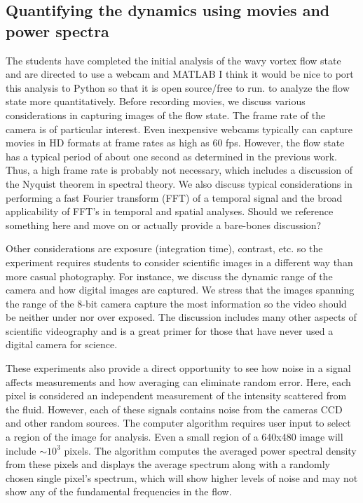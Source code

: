 \documentclass[%
reprint,
 amsmath,amssymb,
 aps,
prb,
floatfix,
longbibliography,
notitlepage
]{revtex4-1}
\newcommand{\DB}[1]{{\color{red}#1}} %
\begin{document}
\subsection{Quantifying the dynamics using movies and power spectra}%
The students have completed the initial analysis of the wavy vortex flow state and are directed to use a webcam and MATLAB \DB{I think it would be nice to port this analysis to Python so that it is open source/free to run.} to analyze the flow state more quantitatively. Before recording movies, we discuss various considerations in capturing images of the flow state. The frame rate of the camera is of particular interest. Even inexpensive webcams typically can capture movies in HD formats at frame rates as high as 60 fps. However, the flow state has a typical period of about one second as determined in the previous work. Thus, a high frame rate is probably not necessary, which includes a discussion of the Nyquist theorem in spectral theory.\cite{nyquist} We also discuss typical considerations in performing a fast Fourier transform (FFT) of a temporal signal and the broad applicability of FFT's in temporal and spatial analyses. \DB{Should we reference something here and move on or actually provide a bare-bones discussion?}

Other considerations are exposure (integration time),  contrast, etc. so the experiment requires students to consider scientific images in a different way than more casual photography. For instance, we discuss the dynamic range of the camera and how digital images are captured. We stress that the images spanning the range of the 8-bit camera capture the most information so the video should be neither under nor over exposed. The discussion includes many other aspects of scientific videography and is a great primer for those that have never used a digital camera for science.

These experiments also provide a direct opportunity to see how noise in a signal affects measurements and how averaging can eliminate random error. Here, each pixel is considered an independent measurement of the intensity scattered from the fluid. However, each of these signals contains noise from the cameras CCD and other random sources. The computer algorithm requires user input to select a region of the image for analysis. Even a small region of a 640x480 image will include $\sim 10^3$ pixels. The algorithm computes the averaged power spectral density from these pixels and displays the average spectrum along with a randomly chosen single pixel's spectrum, which will show higher levels of noise and may not show any of the fundamental frequencies in the flow. 
\end{document}
